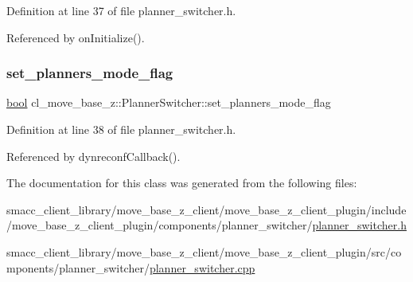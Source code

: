 Definition at line 37 of file planner\+\_\+switcher.\+h.



Referenced by on\+Initialize().

\mbox{\label{classcl__move__base__z_1_1PlannerSwitcher_a6c14fd001513787ed213704e2d3dc383}} 
\subsubsection{\texorpdfstring{set\+\_\+planners\+\_\+mode\+\_\+flag}{set\_planners\_mode\_flag}}
{\footnotesize\ttfamily \hyperlink{classbool}{bool} cl\+\_\+move\+\_\+base\+\_\+z\+::\+Planner\+Switcher\+::set\+\_\+planners\+\_\+mode\+\_\+flag\hspace{0.3cm}{\ttfamily [private]}}



Definition at line 38 of file planner\+\_\+switcher.\+h.



Referenced by dynreconf\+Callback().



The documentation for this class was generated from the following files\+:\begin{DoxyCompactItemize}
\item 
smacc\+\_\+client\+\_\+library/move\+\_\+base\+\_\+z\+\_\+client/move\+\_\+base\+\_\+z\+\_\+client\+\_\+plugin/include/move\+\_\+base\+\_\+z\+\_\+client\+\_\+plugin/components/planner\+\_\+switcher/\hyperlink{planner__switcher_8h}{planner\+\_\+switcher.\+h}\item 
smacc\+\_\+client\+\_\+library/move\+\_\+base\+\_\+z\+\_\+client/move\+\_\+base\+\_\+z\+\_\+client\+\_\+plugin/src/components/planner\+\_\+switcher/\hyperlink{planner__switcher_8cpp}{planner\+\_\+switcher.\+cpp}\end{DoxyCompactItemize}
